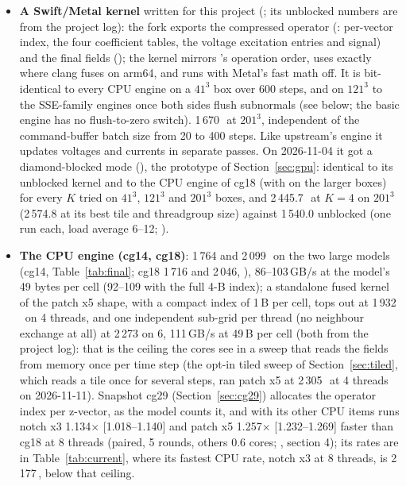\begin{itemize}
  1\,452), above the roughly
  2\,000\,\MC\ that 74\,B per cell allow from the M5's memory (Section~\ref{sec:background}); whether its kernels fuse
  the two half steps or this 0.270\,M-cell model stays in the GPU's caches was not examined.
\item \textbf{A Swift/Metal kernel} written for this project (; its unblocked numbers are from the
  project log): the fork exports the compressed operator (: per-vector index, the four
  coefficient tables, the voltage excitation entries and signal) and the final fields
  (); the kernel mirrors 's operation order, uses 
  exactly where clang fuses on arm64, and runs with Metal's fast math off. It is bit-identical to every CPU engine on
  a $41^3$ box over 600 steps, and on $121^3$ to the SSE-family engines once both sides flush subnormals (see below;
  the basic engine has no flush-to-zero switch). 1\,670\,\MC\ at $201^3$, independent of the command-buffer batch size
  from 20 to 400 steps. Like upstream's engine it updates voltages and currents in separate passes. On 2026-11-04 it
  got a diamond-blocked mode (), the prototype of Section~\ref{sec:gpu}: identical to its unblocked
  kernel and to the CPU engine of cg18 (with  on the larger boxes) for every $K$ tried on $41^3$,
  $121^3$ and $201^3$ boxes, and 2\,445.7\,\MC\ at $K=4$ on $201^3$ (2\,574.8 at its best tile and threadgroup size)
  against 1\,540.0 unblocked (one run each, load average 6--12; ).
\item \textbf{The CPU engine (cg14, cg18)}: 1\,764 and 2\,099\,\MC\ on the two large models (cg14,
  Table~\ref{tab:final}; cg18 1\,716 and 2\,046, ), 86--103\,GB/s at the model's
  49 bytes per cell (92--109 with the full 4-B index); a standalone fused kernel of the patch x5 shape, with a compact
  index of 1\,B per cell, tops out at 1\,932\,\MC\ on 4 threads, and one independent sub-grid per thread (no neighbour
  exchange at all) at 2\,273 on 6, 111\,GB/s at 49\,B per cell (both from the project log): that is the ceiling the
  cores see in a sweep that reads the fields from memory once per time step (the opt-in tiled sweep of
  Section~\ref{sec:tiled}, which reads a tile once for several steps, ran patch x5 at 2\,305\,\MC\ at 4 threads on
  2026-11-11). Snapshot cg29 (Section~\ref{sec:cg29}) allocates the operator index per z-vector, as the model counts
  it, and with its other CPU items runs notch x3 1.134$\times$ [1.018--1.140] and patch x5 1.257$\times$
  [1.232--1.269] faster than cg18 at 8 threads (paired, 5 rounds, others 0.6 cores;
  , section 4); its rates are in Table~\ref{tab:current}, where its
  fastest CPU rate, notch x3 at 8 threads, is 2\,177\,\MC, below that ceiling.
\end{itemize}
